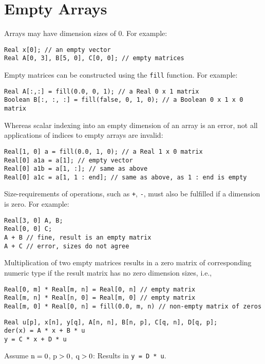 \section{Empty Arrays}\label{empty-arrays}

Arrays may have dimension sizes of 0.  For example:
\begin{lstlisting}[language=modelica]
Real x[0]; // an empty vector
Real A[0, 3], B[5, 0], C[0, 0]; // empty matrices
\end{lstlisting}

Empty matrices can be constructed using the \lstinline!fill! function.
For example:
\begin{lstlisting}[language=modelica]
Real A[:,:] = fill(0.0, 0, 1); // a Real 0 x 1 matrix
Boolean B[:, :, :] = fill(false, 0, 1, 0); // a Boolean 0 x 1 x 0 matrix
\end{lstlisting}

\begin{example}
Whereas scalar indexing into an empty dimension of an array is an error, not all applications of indices to empty arrays are invalid:
\begin{lstlisting}
Real[1, 0] a = fill(0.0, 1, 0); // a Real 1 x 0 matrix
Real[0] a1a = a[1]; // empty vector
Real[0] a1b = a[1, :]; // same as above
Real[0] a1c = a[1, 1 : end]; // same as above, as 1 : end is empty
\end{lstlisting}
\end{example}

Size-requirements of operations, such as \lstinline!+!, \lstinline!-!, must also be fulfilled if a dimension is zero.  For example:
\begin{lstlisting}[language=modelica]
Real[3, 0] A, B;
Real[0, 0] C;
A + B // fine, result is an empty matrix
A + C // error, sizes do not agree
\end{lstlisting}

Multiplication of two empty matrices results in a zero matrix of corresponding numeric type if the result matrix has no zero dimension sizes, i.e.,
\begin{lstlisting}[language=modelica]
Real[0, m] * Real[m, n] = Real[0, n] // empty matrix
Real[m, n] * Real[n, 0] = Real[m, 0] // empty matrix
Real[m, 0] * Real[0, n] = fill(0.0, m, n) // non-empty matrix of zeros
\end{lstlisting}

\begin{example}
\begin{lstlisting}[language=modelica]
Real u[p], x[n], y[q], A[n, n], B[n, p], C[q, n], D[q, p];
der(x) = A * x + B * u
y = C * x + D * u
\end{lstlisting}
Assume $\text{\lstinline!n!} = 0$, $\text{\lstinline!p!} > 0$, $\text{\lstinline!q!} > 0$: Results in \lstinline!y = D * u!.
\end{example}
